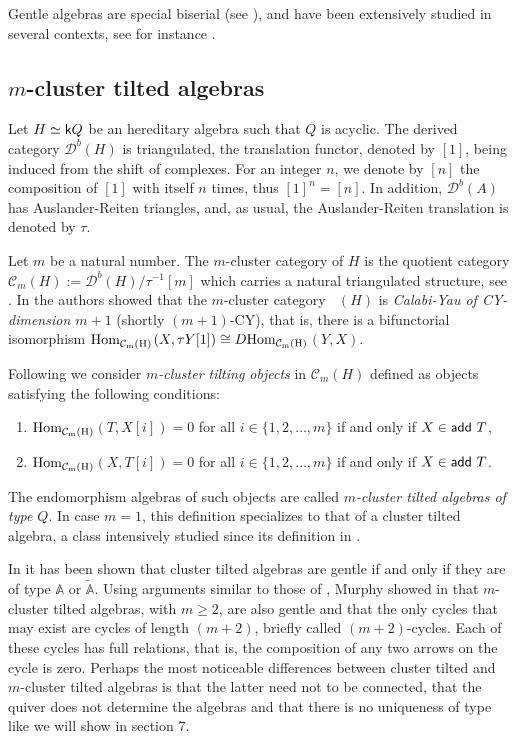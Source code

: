 \documentclass{amsart}
\theoremstyle{plain}
\theoremstyle{definition}
\begin{document}
Gentle algebras are special biserial (see \cite{WW85}), and have  been extensively studied in several contexts, see for instance \cite{Avella-Alaminos2008, BB10, Buan2008, Murphy2010, SZ03}.

\subsection{$m$-cluster tilted algebras}

Let $H\simeq {{\normalfont{\textsf{k}}}} Q$ be an hereditary algebra such that $Q$ is acyclic. The derived category $\mathcal{D}^b(H)$ is triangulated, the translation functor, denoted by $[1]$, being induced from the shift of complexes. For an integer $n$, we denote by $[n]$ the composition of $[1]$ with itself $n$ times, thus $[1]^n = [n]$. In addition, $\mathcal{D}^b(A)$ has Auslander-Reiten triangles, and, as usual, the Auslander-Reiten translation is denoted by $\tau$.

Let $m$ be a natural number. The $m$-cluster category of $H$ is the quotient category $\mathcal{C}_m(H):=\mathcal{D}^b(H)/ \tau^{-1} [m]$ which carries a natural  triangulated structure, see \cite{K05}. In \cite{Buan2006} the authors showed that the $m$-cluster category
${\mathop{\mathcal{C}_m}\nolimits}(H)$ is \textit{Calabi-Yau of CY-dimension $m+1$} (shortly $(m+1)$-CY), that is,  there is a bifunctorial  isomorphism  $\rm Hom_{{\mathop{\mathcal{C}_m}\nolimits}(H)}$$(X,\tau Y[1])\cong D \rm Hom_{{\mathop{\mathcal{C}_m}\nolimits}(H)}$$(Y,X)$.

 Following \cite{Thomas2007} we consider \textit{$m$-cluster tilting objects}  in $\mathcal{C}_m(H)$ defined as objects satisfying the following conditions:
\begin{enumerate}
 \item $\rm Hom_{\mathcal{C}_m(H)}$$ (T,X[i]) = 0$ for all $i\in\{1,2,\ldots,m\}$ if and only if $X\in {\normalfont{\textsf{{add}}}}\ T$,
 \item $\rm Hom_{\mathcal{C}_m(H)}$$ (X,T[i]) = 0$ for all $i\in\{1,2,\ldots,m\}$ if and only if $X\in {\normalfont{\textsf{{add}}}}\ T$.
\end{enumerate}

The endomorphism algebras of such objects are called \emph{$m$-cluster tilted algebras of type $Q$}. In case $m=1$, this definition specializes to that of a cluster tilted algebra, a class intensively studied since its definition in \cite{BMR06}.

In \cite{ABCP09} it has been shown that cluster tilted algebras are gentle if and only if they are of type  $\mathbb{A}$ or $\tilde{\mathbb{A}}$. Using arguments similar to those of \cite{ABCP09}, Murphy showed in \cite{Murphy2010} that $m$-cluster tilted algebras, with $m\geq 2$, are also gentle  and  that the only cycles that may exist  are cycles of length $(m+2)$, briefly called $(m+2)$-cycles. Each of these cycles has full relations, that is, the composition of any two arrows on the cycle is zero. Perhaps the most noticeable differences between cluster tilted and $m$-cluster tilted algebras is that the latter need not to be connected,  that the quiver does not determine the algebras and that  there is no uniqueness of type like we will show in section 7.\\
\end{document}
